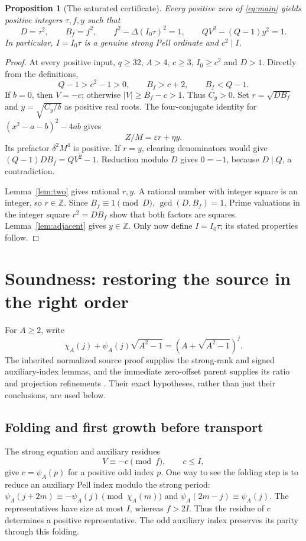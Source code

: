 \documentclass[11pt]{article}
\newtheorem{proposition}[theorem]{Proposition}
\theoremstyle{remark}\newtheorem{remark}[theorem]{Remark}
\newcommand{\Z}{\mathbb Z}
\begin{document}
\begin{proposition}[The saturated certificate]\label{prop:saturation}
Every positive zero of \eqref{eq:main} yields positive integers $\tau,f,y$
such that
\[
D=\tau^2,\qquad B_f=f^2,\qquad
f^2-\Delta(I_0\tau)^2=1,\qquad
QV^2-(Q-1)y^2=1.
\]
In particular, $I=I_0\tau$ is a genuine strong Pell ordinate and
$c^2\mid I$.
\end{proposition}
\begin{proof}
At every positive input, $q\ge32$, $A>4$, $c\ge3$, $I_0\ge c^2$ and
$D>1$. Directly from the definitions,
\[
Q-1>c^2-1>0,\qquad B_f>c+2,\qquad B_f<Q-1.
\]
If $b=0$, then $V=-c$; otherwise $|V|\ge B_f-c>1$. Thus $C_y>0$.
Set $r=\sqrt{DB_f}$ and $y=\sqrt{C_y/\delta}$ as positive real roots.
The four-conjugate identity for $(x^2-a-b)^2-4ab$ gives
\begin{equation}\label{eq:rootrelation}
Z/M=\varepsilon r+\eta y.
\end{equation}
Its prefactor $\delta^2M^4$ is positive. If $r=y$, clearing denominators
would give $(Q-1)DB_f=QV^2-1$. Reduction modulo $D$ gives $0=-1$,
because $D\mid Q$, a contradiction.

Lemma~\ref{lem:two} gives rational $r,y$. A rational number with integer
square is an integer, so $r\in\Z$. Since $B_f\equiv1\pmod D$,
$\gcd(D,B_f)=1$. Prime valuations in the integer square $r^2=DB_f$
show that both factors are squares. Lemma~\ref{lem:adjacent} gives
$y\in\Z$. Only now define $I=I_0\tau$; its stated properties follow.
\end{proof}

\section{Soundness: restoring the source in the right order}

For $A\ge2$, write
\[
\chi_A(j)+\psi_A(j)\sqrt{A^2-1}
       =(A+\sqrt{A^2-1})^j.
\]
The inherited normalized source proof supplies the strong-rank and signed
auxiliary-index lemmas, and the immediate zero-offset parent supplies its
ratio and projection refinements \cite{source61,zerooffset}. Their exact
hypotheses, rather than just their conclusions, are used below.

\subsection{Folding and first growth before transport}

The strong equation and auxiliary residues
\[
V\equiv-c\pmod f,\qquad c\le I,
\]
give $c=\psi_A(p)$ for a positive odd index $p$. One way to see the folding
step is to reduce an auxiliary Pell index modulo the strong period:
$\psi_A(j+2m)\equiv-\psi_A(j)\pmod{\chi_A(m)}$ and
$\psi_A(2m-j)\equiv\psi_A(j)$. The representatives have size at most $I$,
whereas $f>2I$. Thus the residue of $c$ determines a positive representative.
The odd auxiliary index preserves its parity through this folding.
\end{document}

